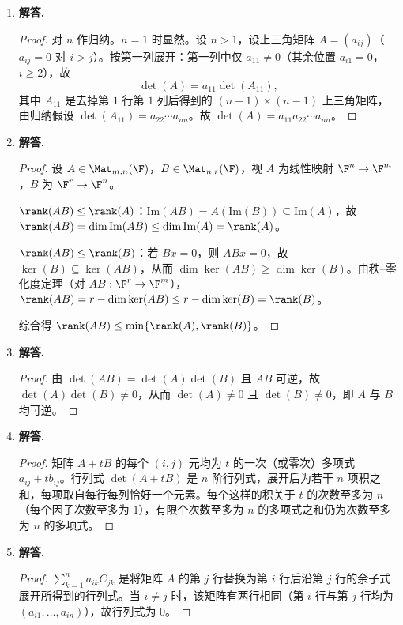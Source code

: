 \begin{enumerate}[label=\textbf{\arabic*.}, leftmargin=*, itemsep=1em]
  \item \textbf{解答.}
  \begin{proof}
  对 $n$ 作归纳。$n=1$ 时显然。设 $n>1$，设上三角矩阵 $A=(a_{ij})$（$a_{ij}=0$ 对 $i>j$）。按第一列展开：第一列中仅 $a_{11}\ne0$（其余位置 $a_{i1}=0$，$i\ge2$），故
  \[
    \det(A)=a_{11}\det(A_{11}),
  \]
  其中 $A_{11}$ 是去掉第 $1$ 行第 $1$ 列后得到的 $(n-1)\times(n-1)$ 上三角矩阵，由归纳假设 $\det(A_{11})=a_{22}\cdots a_{nn}$。故 $\det(A)=a_{11}a_{22}\cdots a_{nn}$。
  \end{proof}

  \item \textbf{解答.}
  \begin{proof}
  设 $A\in\Mat_{m,n}(\F)$，$B\in\Mat_{n,r}(\F)$，视 $A$ 为线性映射 $\F^n\to\F^m$，$B$ 为 $\F^r\to\F^n$。

  \emph{$\rank(AB)\le\rank(A)$}：$\mathrm{Im}(AB)=A(\mathrm{Im}(B))\subseteq\mathrm{Im}(A)$，故 $\rank(AB)=\dim\mathrm{Im}(AB)\le\dim\mathrm{Im}(A)=\rank(A)$。

  \emph{$\rank(AB)\le\rank(B)$}：若 $Bx=0$，则 $ABx=0$，故 $\ker(B)\subseteq\ker(AB)$，从而 $\dim\ker(AB)\ge\dim\ker(B)$。由秩–零化度定理（对 $AB:\F^r\to\F^m$），$\rank(AB)=r-\dim\ker(AB)\le r-\dim\ker(B)=\rank(B)$。

  综合得 $\rank(AB)\le\min\{\rank(A),\rank(B)\}$。
  \end{proof}

  \item \textbf{解答.}
  \begin{proof}
  由 $\det(AB)=\det(A)\det(B)$ 且 $AB$ 可逆，故 $\det(A)\det(B)\ne0$，从而 $\det(A)\ne0$ 且 $\det(B)\ne0$，即 $A$ 与 $B$ 均可逆。
  \end{proof}

  \item \textbf{解答.}
  \begin{proof}
  矩阵 $A+tB$ 的每个 $(i,j)$ 元均为 $t$ 的一次（或零次）多项式 $a_{ij}+tb_{ij}$。行列式 $\det(A+tB)$ 是 $n$ 阶行列式，展开后为若干 $n$ 项积之和，每项取自每行每列恰好一个元素。每个这样的积关于 $t$ 的次数至多为 $n$（每个因子次数至多为 $1$），有限个次数至多为 $n$ 的多项式之和仍为次数至多为 $n$ 的多项式。
  \end{proof}

  \item \textbf{解答.}
  \begin{proof}
  $\sum_{k=1}^n a_{ik}C_{jk}$ 是将矩阵 $A$ 的第 $j$ 行替换为第 $i$ 行后沿第 $j$ 行的余子式展开所得到的行列式。当 $i\ne j$ 时，该矩阵有两行相同（第 $i$ 行与第 $j$ 行均为 $(a_{i1},\dots,a_{in})$），故行列式为 $0$。
  \end{proof}


\end{enumerate}
